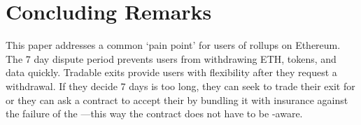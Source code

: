 \section{Concluding Remarks}

This paper addresses a common `pain point' for users of \layertwo rollups on Ethereum. The 7 day dispute period prevents users from withdrawing ETH, tokens, and data quickly. Tradable exits provide users with flexibility after they request a withdrawal. If they decide 7 days is too long, they can seek to trade their exit for \ethone or they can ask a contract to accept their \ethxx by bundling it with insurance against the failure of the \rblock---this way the contract does not have to be \layertwo-aware.



